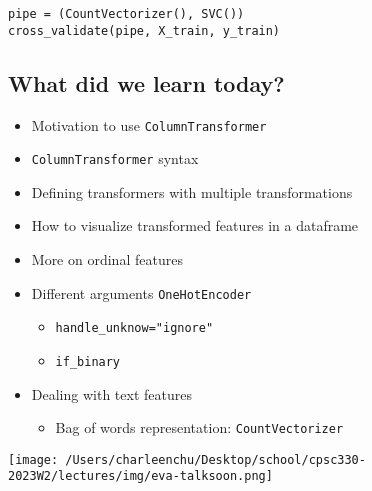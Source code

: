 \documentclass[11pt]{article}
\providecommand{\tightlist}{%
      \setlength{\itemsep}{0pt}\setlength{\parskip}{0pt}}
\begin{document}
\begin{verbatim}
pipe = (CountVectorizer(), SVC())
cross_validate(pipe, X_train, y_train)
\end{verbatim}

    

    \subsection{What did we learn today?}\label{what-did-we-learn-today}

\begin{itemize}
\tightlist
\item
  Motivation to use \texttt{ColumnTransformer}
\item
  \texttt{ColumnTransformer} syntax
\item
  Defining transformers with multiple transformations
\item
  How to visualize transformed features in a dataframe
\item
  More on ordinal features
\item
  Different arguments \texttt{OneHotEncoder}

  \begin{itemize}
  \tightlist
  \item
    \texttt{handle\_unknow="ignore"}
  \item
    \texttt{if\_binary}
  \end{itemize}
\item
  Dealing with text features

  \begin{itemize}
  \tightlist
  \item
    Bag of words representation: \texttt{CountVectorizer}
  \end{itemize}
\end{itemize}

    \texttt{[image: /Users/charleenchu/Desktop/school/cpsc330-2023W2/lectures/img/eva-talksoon.png]}


    
    
    
\end{document}
